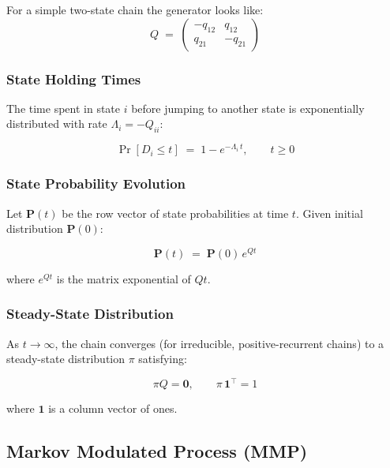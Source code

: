 For a simple two-state chain the generator looks like:
\[
  Q
  \;=\;
  \begin{pmatrix}
    -q_{12} & q_{12} \\
     q_{21} & -q_{21}
  \end{pmatrix}
\]
 
\subsubsection{State Holding Times}
 
The time spent in state $i$ before jumping to another state is
exponentially distributed with rate $\Lambda_i = -Q_{ii}$:
 
\begin{equation}
  \Pr[D_i \leq t]
  \;=\;
  1 - e^{-\Lambda_i\, t},
  \qquad t \geq 0
  \label{eq:holding}
\end{equation}
 
\subsubsection{State Probability Evolution}
 
Let $\mathbf{P}(t)$ be the row vector of state probabilities at
time $t$. Given initial distribution $\mathbf{P}(0)$:
 
\begin{equation}
  \mathbf{P}(t)
  \;=\;
  \mathbf{P}(0)\,e^{Qt}
  \label{eq:state_prob}
\end{equation}
 
where $e^{Qt}$ is the matrix exponential of $Qt$.
 
\subsubsection{Steady-State Distribution}
 
As $t \to \infty$, the chain converges (for irreducible,
positive-recurrent chains) to a steady-state distribution $\pi$
satisfying:
 
\begin{equation}
  \pi Q = \mathbf{0},
  \qquad
  \pi\,\mathbf{1}^{\top} = 1
  \label{eq:steadystate}
\end{equation}
 
where $\mathbf{1}$ is a column vector of ones.
 
\subsection{Markov Modulated Process (MMP)}
 

